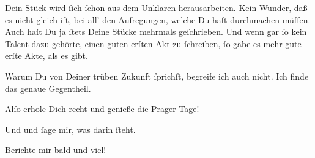 \pstart
           Dein Stück wird ſich ſchon aus
               dem Unklaren herausarbeiten. Kein Wunder, daß es nicht gleich \label{K_L02832-3v}\label{K_L02832-3} iſt, bei all’ den Aufregungen, welche Du haſt durchmachen müſſen. Auch haſt
               Du ja ſtets Deine Stücke mehrmals geſchrieben. Und wenn  gar ſo kein Talent dazu gehörte, einen {\pb}guten erſten Akt zu ſchreiben, ſo gäbe es mehr gute erſte Akte, als es gibt.\pend
           
\pstart
           Warum Du von Deiner trüben Zukunft ſprichſt, begreife ich auch nicht. Ich finde das
               genaue Gegentheil.\pend
           
\pstart
           Alſo erhole Dich recht und genieße die Prager Tage!\pend
           
\pstart
           Und \label{K_L02832-4v}\label{K_L02832-4} und ſage mir, was darin ſteht.\pend
           
\pstart
           Berichte mir  bald und viel!\pend
           
